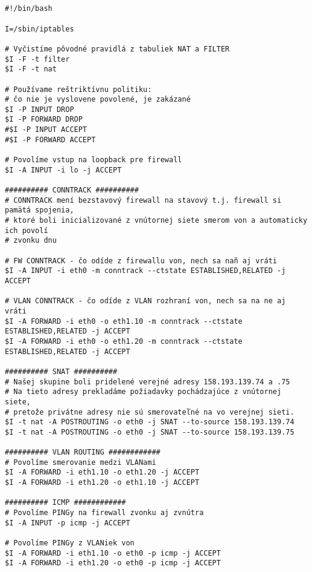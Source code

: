 \noindent
{\selectfont
\\

\begin{small}

\begin{verbatim}

#!/bin/bash

I=/sbin/iptables

# Vyčistíme pôvodné pravidlá z tabuliek NAT a FILTER
$I -F -t filter
$I -F -t nat

# Používame reštriktívnu politiku:
# čo nie je vyslovene povolené, je zakázané
$I -P INPUT DROP
$I -P FORWARD DROP
#$I -P INPUT ACCEPT
#$I -P FORWARD ACCEPT

# Povolíme vstup na loopback pre firewall
$I -A INPUT -i lo -j ACCEPT

########## CONNTRACK ##########
# CONNTRACK mení bezstavový firewall na stavový t.j. firewall si pamätá spojenia,
# ktoré boli inicializované z vnútornej siete smerom von a automaticky ich povolí
# zvonku dnu

# FW CONNTRACK - čo odíde z firewallu von, nech sa naň aj vráti
$I -A INPUT -i eth0 -m conntrack --ctstate ESTABLISHED,RELATED -j ACCEPT

# VLAN CONNTRACK - čo odíde z VLAN rozhraní von, nech sa na ne aj vráti
$I -A FORWARD -i eth0 -o eth1.10 -m conntrack --ctstate ESTABLISHED,RELATED -j ACCEPT
$I -A FORWARD -i eth0 -o eth1.20 -m conntrack --ctstate ESTABLISHED,RELATED -j ACCEPT

########## SNAT ##########
# Našej skupine boli pridelené verejné adresy 158.193.139.74 a .75
# Na tieto adresy prekladáme požiadavky pochádzajúce z vnútornej siete,
# pretože privátne adresy nie sú smerovateľné na vo verejnej sieti.
$I -t nat -A POSTROUTING -o eth0 -j SNAT --to-source 158.193.139.74
$I -t nat -A POSTROUTING -o eth0 -j SNAT --to-source 158.193.139.75

########## VLAN ROUTING ############
# Povolíme smerovanie medzi VLANami
$I -A FORWARD -i eth1.10 -o eth1.20 -j ACCEPT
$I -A FORWARD -i eth1.20 -o eth1.10 -j ACCEPT

########## ICMP ############
# Povolíme PINGy na firewall zvonku aj zvnútra
$I -A INPUT -p icmp -j ACCEPT

# Povolíme PINGy z VLANiek von
$I -A FORWARD -i eth1.10 -o eth0 -p icmp -j ACCEPT
$I -A FORWARD -i eth1.20 -o eth0 -p icmp -j ACCEPT


\end{verbatim}
\end{small}}
